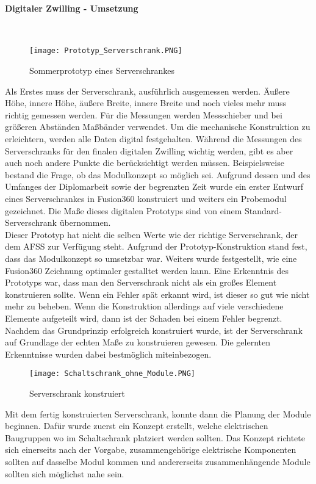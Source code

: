     \paragraph{Digitaler Zwilling - Umsetzung}\mbox{}\\ 

    \begin{figure}[h]
        \centering
        \texttt{[image: Prototyp\_Serverschrank.PNG]}
        \caption{Sommerprototyp eines Serverschrankes}
        \label{fig:Sommerprototyp}
    \end{figure}
    Als Erstes muss der Serverschrank, ausführlich ausgemessen werden. Äußere Höhe, innere Höhe, äußere Breite, innere Breite und noch vieles mehr muss richtig gemessen werden.    
    Für die Messungen werden Messschieber und bei größeren Abständen Maßbänder verwendet. Um die mechanische Konstruktion zu erleichtern, werden alle Daten digital festgehalten. Während die Messungen des Serverschranks für den finalen digitalen Zwilling wichtig werden, gibt es aber auch noch andere Punkte die berücksichtigt werden müssen. Beispielsweise bestand die Frage, ob das Modulkonzept so möglich sei. Aufgrund dessen und des Umfanges der Diplomarbeit sowie der begrenzten Zeit wurde ein erster Entwurf eines Serverschrankes in Fusion360 konstruiert und weiters ein Probemodul gezeichnet. Die Maße dieses digitalen Prototyps sind von einem Standard-Serverschrank übernommen.\\
    Dieser Prototyp hat nicht die selben Werte wie der richtige Serverschrank, der dem AFSS zur Verfügung steht. Aufgrund der Prototyp-Konstruktion stand fest, dass das Modulkonzept so umsetzbar war. Weiters wurde festgestellt, wie eine Fusion360 Zeichnung optimaler gestalltet werden kann. Eine Erkenntnis des Prototyps war, dass man den Serverschrank nicht als ein großes Element konstruieren sollte. Wenn ein Fehler spät erkannt wird, ist dieser so gut wie nicht mehr zu beheben. Wenn die Konstruktion allerdings auf viele verschiedene Elemente aufgeteilt wird, dann ist der Schaden bei einem Fehler begrenzt.\\
    Nachdem das Grundprinzip erfolgreich konstruiert wurde, ist der Serverschrank auf Grundlage der echten Maße zu konstruieren gewesen. Die gelernten Erkenntnisse wurden dabei bestmöglich miteinbezogen.\\    
    \begin{figure}[h]
        \centering
        \texttt{[image: Schaltschrank\_ohne\_Module.PNG]} 
        \caption{Serverschrank konstruiert}
        \label{fig:Clean_Serverschrank}
    \end{figure}
    Mit dem fertig konstruierten Serverschrank, konnte dann die Planung der Module beginnen. Dafür wurde zuerst ein Konzept erstellt, welche elektrischen Baugruppen wo im Schaltschrank platziert werden sollten. Das Konzept richtete sich einerseits nach der Vorgabe, zusammengehörige elektrische Komponenten sollten auf dasselbe Modul kommen und andererseits zusammenhängende Module sollten sich möglichst nahe sein. 
